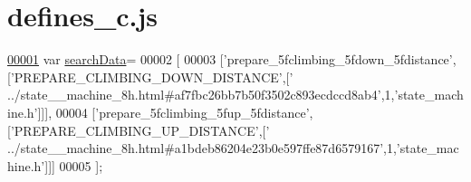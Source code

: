 \hypertarget{defines__c_8js_source}{}\section{defines\+\_\+c.\+js}
\label{defines__c_8js_source}

\begin{DoxyCode}
\hypertarget{defines__c_8js_source.tex_l00001}{}\hyperlink{defines__c_8js_ad01a7523f103d6242ef9b0451861231e}{00001} var \hyperlink{defines__c_8js_ad01a7523f103d6242ef9b0451861231e}{searchData}=
00002 [
00003   [\textcolor{stringliteral}{'prepare\_5fclimbing\_5fdown\_5fdistance'},[\textcolor{stringliteral}{'PREPARE\_CLIMBING\_DOWN\_DISTANCE'},[\textcolor{stringliteral}{'
      ../state\_\_machine\_8h.html#af7fbc26bb7b50f3502c893ecdccd8ab4'},1,\textcolor{stringliteral}{'state\_machine.h'}]]],
00004   [\textcolor{stringliteral}{'prepare\_5fclimbing\_5fup\_5fdistance'},[\textcolor{stringliteral}{'PREPARE\_CLIMBING\_UP\_DISTANCE'},[\textcolor{stringliteral}{'
      ../state\_\_machine\_8h.html#a1bdeb86204e23b0e597ffe87d6579167'},1,\textcolor{stringliteral}{'state\_machine.h'}]]]
00005 ];
\end{DoxyCode}
